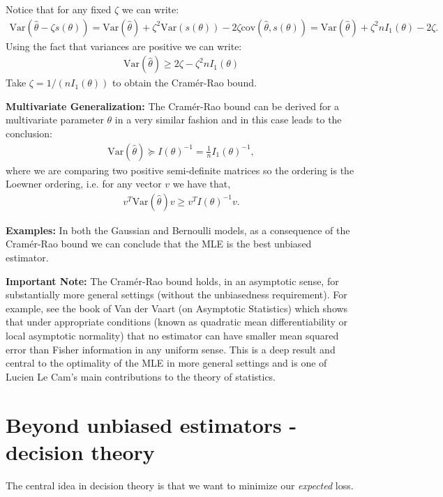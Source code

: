 \documentclass[twoside,12pt]{article}
\begin{document}
Notice that for any fixed $\zeta$ we can write:
\begin{align*}
\text{Var}(\widehat{\theta} - \zeta s(\theta)) = \text{Var}(\widehat{\theta}) + \zeta^2 \text{Var}(s(\theta)) - 2 \zeta
\text{cov}(\widehat{\theta},s(\theta)) = \text{Var}(\widehat{\theta}) + \zeta^2 n I_1(\theta) - 2 \zeta.
\end{align*}
Using the fact that variances are positive we can write:
\begin{align*}
\text{Var}(\widehat{\theta}) \geq 2 \zeta - \zeta^2 n I_1(\theta)
\end{align*}
Take $\zeta = 1/(n I_1(\theta))$ to obtain the Cram\'{e}r-Rao bound.


{\bf Multivariate Generalization: } The Cram\'{e}r-Rao bound can be derived for a multivariate parameter $\theta$ in a very similar fashion and in this case leads to the conclusion:
\begin{align*}
\text{Var}(\widehat{\theta}) \succeq I(\theta)^{-1} = \frac{1}{n} I_1(\theta)^{-1},
\end{align*}
where we are comparing two positive semi-definite matrices so the ordering is the Loewner ordering, i.e. for any vector $v$ we have that,
\begin{align*}
v^{T} \text{Var}(\widehat{\theta}) v \geq v^T  I(\theta)^{-1} v.
\end{align*}

{\bf Examples: } In both the Gaussian and Bernoulli models, as a consequence of the Cram\'{e}r-Rao bound we can conclude that the MLE is the best unbiased estimator. 

{\bf Important Note: } The Cram\'{e}r-Rao bound holds, in an asymptotic sense, for substantially
more general settings (without the unbiasedness requirement). For example, see the book of Van der Vaart (on Asymptotic Statistics) which shows that under appropriate
conditions (known as quadratic mean differentiability or local asymptotic normality)
that no estimator can have smaller mean squared error than Fisher information in any uniform
sense. This is a deep result and central to the optimality of the MLE in more general settings and is one of Lucien Le Cam's main contributions to the theory of statistics.


\section{Beyond unbiased estimators - decision theory}
The central idea in decision theory is that we want to minimize our \emph{expected} loss. 
\end{document}
